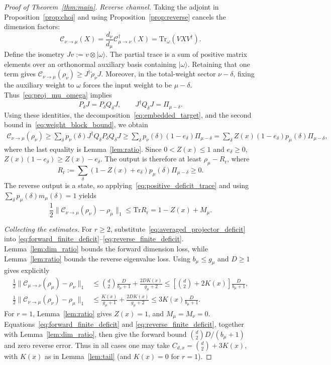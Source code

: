 \documentclass[a4paper,onecolumn,11pt]{quantumarticle}
\newcommand{\ket}[1]{| #1 \rangle}
\newcommand*{\Tr}{\mathrm{Tr}}
\def\C{\mathcal{C}}
\begin{document}
\begin{proof}[Proof of Theorem~\ref{thm:main}]
\emph{Reverse channel.}
Taking the adjoint in Proposition~\ref{prop:choi} and using
Proposition~\ref{prop:reverse} cancels the dimension factors:
\[
\C_{\nu\to\mu}(X)
=\frac{d_\nu}{d_\mu}\C_{\mu\to\nu}^{\dagger}(X)
=\Tr_\omega(VXV^\dagger).
\]
Define the isometry $Jv:=v\otimes\ket{\omega}$.
The partial trace is a sum of positive matrix elements over an
orthonormal auxiliary basis containing $\ket{\omega}$. Retaining
that one term gives
$\C_{\nu\to\mu}(\rho_\nu)\ge J^\dagger\widetilde\rho_\nu J$.
Moreover, in the total-weight sector $\nu-\delta$, fixing the auxiliary
weight to $\omega$ forces the input weight to be $\mu-\delta$.
Thus~\eqref{eq:proj_mu_omega} implies
\[
P_\delta J=P_\delta Q_\delta J,\qquad
J^\dagger Q_\delta J=\Pi_{\mu-\delta}.
\]
Using these identities, the decomposition~\eqref{eq:embedded_target},
and the second bound in~\eqref{eq:weight_block_bound}, we obtain
\begin{align*}
\C_{\nu\to\mu}(\rho_\nu)
\ge\sum_\delta p_\nu(\delta)
J^\dagger Q_\delta P_\delta Q_\delta J
\ge\sum_\delta p_\nu(\delta)(1-e_\delta)\Pi_{\mu-\delta}
=\sum_\delta Z(x)(1-e_\delta)
 p_\mu(\delta)\Pi_{\mu-\delta},
\end{align*}
where the last equality is Lemma~\ref{lem:ratio}.
Since $0<Z(x)\le1$ and $e_\delta\ge0$,
$Z(x)(1-e_\delta)\ge Z(x)-e_\delta$. The output is therefore at least
$\rho_\mu-R_{\mathrm r}$, where
\[
R_{\mathrm r}:=\sum_\delta(1-Z(x)+e_\delta)
 p_\mu(\delta)\Pi_{\mu-\delta}\ge0.
\]
The reverse output is a state, so applying~\eqref{eq:positive_deficit_trace}
and using $\sum_\delta p_\mu(\delta)m_\mu(\delta)=1$ yields
\begin{equation}\label{eq:reverse_finite_deficit}
\frac12\|\C_{\nu\to\mu}(\rho_\nu)-\rho_\mu\|_1
\le\Tr R_{\mathrm r}=1-Z(x)+M_\mu.
\end{equation}

\emph{Collecting the estimates.}
For $r\ge2$, substitute~\eqref{eq:averaged_projector_deficit} into
\eqref{eq:forward_finite_deficit}--\eqref{eq:reverse_finite_deficit}.
Lemma~\ref{lem:dim_ratio} bounds the forward dimension loss, while
Lemma~\ref{lem:ratio} bounds the reverse eigenvalue loss. Using
$b_\mu\le g_\mu$ and $D\ge1$ gives explicitly
\begin{align*}
\frac12\|\C_{\mu\to\nu}(\rho_\mu)-\rho_\nu\|_1
&\le\binom d2\frac{D}{b_\mu+1}
+\frac{2D K(x)}{g_\mu+2}
\le\left[\binom d2+2K(x)\right]\frac{D}{b_\mu+1},\\
\frac12\|\C_{\nu\to\mu}(\rho_\nu)-\rho_\mu\|_1
&\le\frac{K(x)}{g_\mu+1}
+\frac{2D K(x)}{g_\mu+2}
\le3K(x)\frac{D}{b_\mu+1}.
\end{align*}
For $r=1$, Lemma~\ref{lem:ratio} gives $Z(x)=1$, and
$M_\mu=M_\nu=0$. Equations~\eqref{eq:forward_finite_deficit} and
\eqref{eq:reverse_finite_deficit}, together with
Lemma~\ref{lem:dim_ratio}, then give the forward bound
$\binom d2 D/(b_\mu+1)$ and zero reverse error.
Thus in all cases one may take
$C_{d,x}=\binom d2+3K(x)$, with $K(x)$ as in
Lemma~\ref{lem:tail} (and $K(x)=0$ for $r=1$).
\end{proof}
\end{document}
